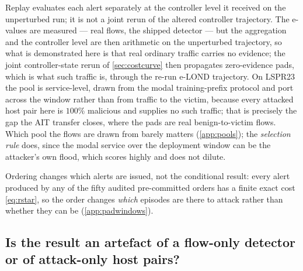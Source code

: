 \documentclass[conference]{IEEEtran}
\begin{document}
Replay evaluates each alert separately at the controller level it received on the unperturbed run; it
is not a joint rerun of the altered controller trajectory. The e-values are measured --- real flows,
the shipped detector --- but the aggregation and the controller level are then arithmetic on the
unperturbed trajectory, so what is demonstrated here is that real ordinary traffic carries no
evidence; the joint controller-state rerun of \cref{sec:costcurve} then propagates zero-evidence
pads, which is what such traffic is, through the re-run e-LOND trajectory. On LSPR23 the pool is
service-level,
drawn from the modal training-prefix protocol and port across the window rather than from traffic to
the victim, because every attacked host pair here is $100\%$ malicious and supplies no such traffic;
that is precisely the gap the AIT transfer closes, where the pads are real benign-to-victim flows.
Which pool the flows are drawn from barely matters (\cref{app:pools}); the \emph{selection rule} does,
since the modal service over the deployment window can be the attacker's own flood, which scores highly
and does not dilute.

Ordering changes which alerts are issued, not the conditional result: every alert produced by any of the fifty audited pre-committed orders has a finite exact cost
\eqref{eq:rstar}, so the order changes \emph{which} episodes are there to attack rather than whether
they can be (\cref{app:padwindows}).

\subsection{Is the result an artefact of a flow-only detector or of attack-only host pairs?}\label{sec:transferattack}
\end{document}
